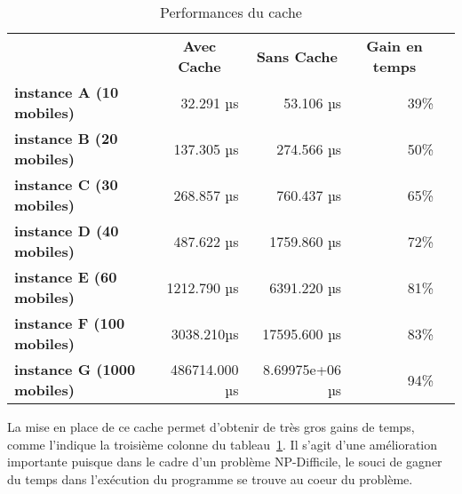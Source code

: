         \begin{table}[H]
            \centering
            \begin{tabular}{l|r|r|r|l}
            \cline{2-4}
                                                                     & \multicolumn{1}{c|}{\textbf{Avec Cache}} & \multicolumn{1}{c|}{\textbf{Sans Cache}} & \multicolumn{1}{c|}{\textbf{Gain en temps}} &  \\ \cline{1-4}
            \multicolumn{1}{|l|}{\textbf{instance A (10 mobiles)}}   & 32.291 µs                               & 53.106 µs                               & 39\%                               &  \\ \cline{1-4}
            \multicolumn{1}{|l|}{\textbf{instance B (20 mobiles)}}   & 137.305 µs                               & 274.566 µs                               & 50\%                               &  \\ \cline{1-4}
            \multicolumn{1}{|l|}{\textbf{instance C (30 mobiles)}}   & 268.857 µs                               & 760.437 µs                               & 65\%                               &  \\ \cline{1-4}
            \multicolumn{1}{|l|}{\textbf{instance D (40 mobiles)}}   & 487.622 µs                               & 1759.860 µs                               & 72\%                               &  \\ \cline{1-4}
            \multicolumn{1}{|l|}{\textbf{instance E (60 mobiles)}}   & 1212.790 µs                               & 6391.220 µs                               & 81\%                               &  \\ \cline{1-4}
            \multicolumn{1}{|l|}{\textbf{instance F (100 mobiles)}}  & 3038.210µs                                & 17595.600 µs                               & 83\%                               &  \\ \cline{1-4}
            \multicolumn{1}{|l|}{\textbf{instance G (1000 mobiles)}} & 486714.000 µs                                & 8.69975e+06 µs                           & 94\%                               &  \\ \cline{1-4}
            \end{tabular}
            \caption{Performances du cache}
            \label{tab:cache-perf}
        \end{table}
    	
    	La mise en place de ce cache permet d'obtenir de très gros gains de temps, comme l'indique la troisième colonne du tableau~\ref{tab:cache-perf}. Il s'agit d'une amélioration importante puisque dans le cadre d'un problème NP-Difficile, le souci de gagner du temps dans l'exécution du programme se trouve au coeur du problème.
    	
